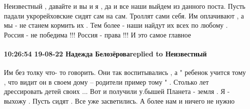 Неизвестный , давайте и вы и я , да и все наши выйдем из данного поста. Пусть
падали укрорейховские сидят сам на сам. Троллят сами себя. Им оплачивают , а мы
- не станем кормить их . Тем более - наши найдут их всех по любому . Россия -
не победима !!! Россия - права !!! И это самое главное

\paragraph{10:26:54 19-08-22 Надежда Белозёроваreplied to Неизвестный}

Им без толку что- то говорить. Они так воспитывались , а " ребенок учится тому
, что видит он в своем дому -- родители пример тому " . Столько лет
дрессировать детей своих ... Вот и получили у.бышей Планета - земля . Я -
выхожу . Пусть сидят . Все уже засветились. А более нам и ничего не нужно
